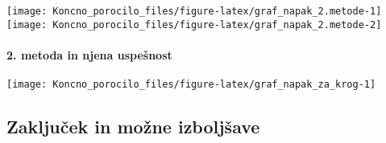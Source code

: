 \documentclass[
]{article}
\begin{document}
\texttt{[image: Koncno\_porocilo\_files/figure-latex/graf\_napak\_2.metode-1]}
\texttt{[image: Koncno\_porocilo\_files/figure-latex/graf\_napak\_2.metode-2]}

\hypertarget{metoda-in-njena-uspeux161nost}{%
\paragraph{2. metoda in njena
uspešnost}\label{metoda-in-njena-uspeux161nost}}

\begin{center}\texttt{[image: Koncno\_porocilo\_files/figure-latex/graf\_napak\_za\_krog-1]} \end{center}

\hypertarget{zakljuux10dek-in-moux17ene-izboljux161ave}{%
\subsection{Zaključek in možne
izboljšave}\label{zakljuux10dek-in-moux17ene-izboljux161ave}}
\end{document}
